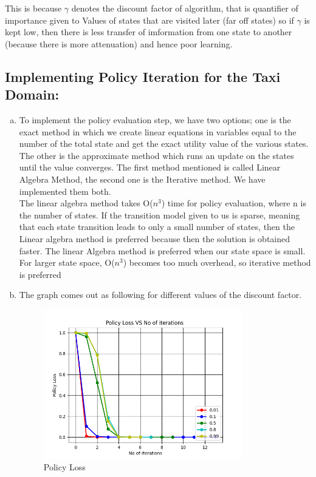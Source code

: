 \documentclass{article}
\begin{document}
\begin{enumerate}[a)]
    This is because $\gamma$ denotes the discount factor of algorithm, that is quantifier of importance given to Values of states that are visited later (far off states) so if $\gamma$ is kept low, then there is less transfer of imformation from one state to another (because there is more attenuation) and hence poor learning.

\end{enumerate}
\subsection{Implementing Policy Iteration for the Taxi Domain:}
\begin{enumerate}[a)]
    \item To implement the policy evaluation step, we have two options; one is the exact method in which we create linear equations in variables equal to the number of the total state and get the exact utility value of the various states. The other is the approximate method which runs an update on the states until the value converges.
The first method mentioned is called Linear Algebra Method, the second one is the Iterative method. We have implemented them both. \\

The linear algebra method takes O($n^3$) time for policy evaluation, where n is the number of states. If the transition model given to us is sparse, meaning that each state transition leads to only a small number of states, then the Linear algebra method is preferred because then the solution is obtained faster. The linear Algebra method is preferred when our state space is small. For larger state space, O($n^3$) becomes too much overhead, so iterative method is preferred
    \pagebreak
\item The graph comes out as following for different values of the discount factor.
    \begin{center}
        \begin{figure}[h]
\hfill\includegraphics[height=6.5cm]{QA3b.png}\hspace*{\fill}
    \caption{Policy Loss}
    \label{fig:Policy Loss}
\end{figure}
\end{center}


\end{enumerate}
\end{document}
